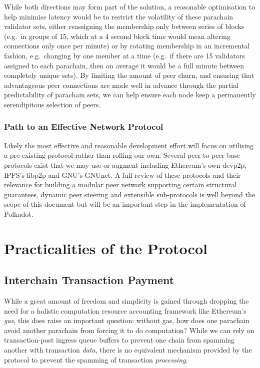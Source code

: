 \documentclass[9pt,oneside]{amsart}
\makeatletter
\newcommand*\eg{e.g.\@\xspace}
\makeatother
\begin{document}
\begin{multicols}{2}
While both directions may form part of the solution, a reasonable optimisation to help minimise latency would be to restrict the volatility of these parachain validator sets, either reassigning the membership only between series of blocks (\eg~in groups of 15, which at a 4 second block time would mean altering connections only once per minute) or by rotating membership in an incremental fashion, \eg~changing by one member at a time (\eg~if there are 15 validators assigned to each parachain, then on average it would be a full minute between completely unique sets). By limiting the amount of peer churn, and ensuring that advantageous peer connections are made well in advance through the partial predictability of parachain sets, we can help ensure each node keep a permanently serendipitous selection of peers.

\subsubsection{Path to an Effective Network Protocol}
\label{path-to-an-effective-network-protocol}

Likely the most effective and reasonable development effort will focus on utilising a pre-existing protocol rather than rolling our own. Several peer-to-peer base protocols exist that we may use or augment including Ethereum's own devp2p\cite{devp2p}, IPFS's libp2p\cite{libp2p} and GNU's GNUnet\cite{bennett2002gnunet}. A full review of these protocols and their relevance for building a modular peer network supporting certain structural guarantees, dynamic peer steering and extensible sub-protocols is well beyond the scope of this document but will be an important step in the implementation of Polkadot.

\section{Practicalities of the Protocol}
\label{practicalities-of-the-protocol}

\subsection{Interchain Transaction Payment}

While a great amount of freedom and simplicity is gained through dropping the need for a holistic computation resource accounting framework like Ethereum's \textit{gas}, this does raise an important question: without gas, how does one parachain avoid another parachain from forcing it to do computation? While we can rely on transaction-post ingress queue buffers to prevent one chain from spamming another with transaction \textit{data}, there is no equivalent mechanism provided by the protocol to prevent the spamming of transaction \textit{processing}.


\end{multicols}
\end{document}

